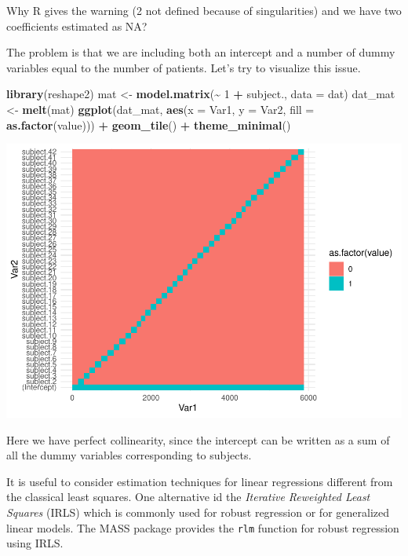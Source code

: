 \documentclass[
]{article}
\newenvironment{Shaded}{\begin{snugshade}}{\end{snugshade}}
\newcommand{\AttributeTok}[1]{\textcolor[rgb]{0.13,0.29,0.53}{#1}}
\newcommand{\DecValTok}[1]{\textcolor[rgb]{0.00,0.00,0.81}{#1}}
\newcommand{\FunctionTok}[1]{\textcolor[rgb]{0.13,0.29,0.53}{\textbf{#1}}}
\newcommand{\NormalTok}[1]{#1}
\newcommand{\OtherTok}[1]{\textcolor[rgb]{0.56,0.35,0.01}{#1}}
\newcommand{\SpecialCharTok}[1]{\textcolor[rgb]{0.81,0.36,0.00}{\textbf{#1}}}
\begin{document}
Why R gives the warning (2 not defined because of singularities) and we
have two coefficients estimated as NA?

The problem is that we are including both an intercept and a number of
dummy variables equal to the number of patients. Let's try to visualize
this issue.

\begin{Shaded}
\begin{Highlighting}[]
\FunctionTok{library}\NormalTok{(reshape2)}
\NormalTok{mat }\OtherTok{\textless{}{-}} \FunctionTok{model.matrix}\NormalTok{(}\SpecialCharTok{\textasciitilde{}} \DecValTok{1} \SpecialCharTok{+}\NormalTok{ subject., }\AttributeTok{data =}\NormalTok{ dat)}
\NormalTok{dat\_mat }\OtherTok{\textless{}{-}} \FunctionTok{melt}\NormalTok{(mat)}
\FunctionTok{ggplot}\NormalTok{(dat\_mat, }\FunctionTok{aes}\NormalTok{(}\AttributeTok{x =}\NormalTok{ Var1, }\AttributeTok{y =}\NormalTok{ Var2, }\AttributeTok{fill =} \FunctionTok{as.factor}\NormalTok{(value))) }\SpecialCharTok{+} 
  \FunctionTok{geom\_tile}\NormalTok{() }\SpecialCharTok{+} 
  \FunctionTok{theme\_minimal}\NormalTok{()}
\end{Highlighting}
\end{Shaded}

\includegraphics{Regression_files/figure-latex/unnamed-chunk-11-1.pdf}

Here we have perfect collinearity, since the intercept can be written as
a sum of all the dummy variables corresponding to subjects.

It is useful to consider estimation techniques for linear regressions
different from the classical least squares. One alternative id the
\emph{Iterative Reweighted Least Squares} (IRLS) which is commonly used
for robust regression or for generalized linear models. The MASS package
provides the \texttt{rlm} function for robust regression using IRLS.
\end{document}

